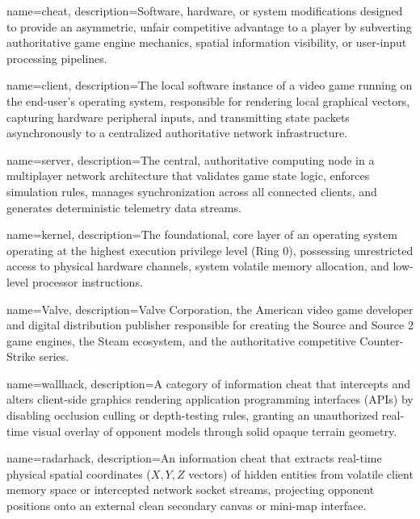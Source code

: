 \makeglossaries


{
    name=cheat,
    description={Software, hardware, or system modifications designed to provide an asymmetric, unfair competitive advantage to a player by subverting authoritative game engine mechanics, spatial information visibility, or user-input processing pipelines.}
}

{
    name=client,
    description={The local software instance of a video game running on the end-user's operating system, responsible for rendering local graphical vectors, capturing hardware peripheral inputs, and transmitting state packets asynchronously to a centralized authoritative network infrastructure.}
}

{
    name=server,
    description={The central, authoritative computing node in a multiplayer network architecture that validates game state logic, enforces simulation rules, manages synchronization across all connected clients, and generates deterministic telemetry data streams.}
}

{
    name=kernel,
    description={The foundational, core layer of an operating system operating at the highest execution privilege level (Ring 0), possessing unrestricted access to physical hardware channels, system volatile memory allocation, and low-level processor instructions.}
}

{
    name=Valve,
    description={Valve Corporation, the American video game developer and digital distribution publisher responsible for creating the Source and Source 2 game engines, the Steam ecosystem, and the authoritative competitive Counter-Strike series.}
}

{
    name=wallhack,
    description={A category of information cheat that intercepts and alters client-side graphics rendering application programming interfaces (APIs) by disabling occlusion culling or depth-testing rules, granting an unauthorized real-time visual overlay of opponent models through solid opaque terrain geometry.}
}

{
    name=radarhack,
    description={An information cheat that extracts real-time physical spatial coordinates ($X, Y, Z$ vectors) of hidden entities from volatile client memory space or intercepted network socket streams, projecting opponent positions onto an external clean secondary canvas or mini-map interface.}
}


